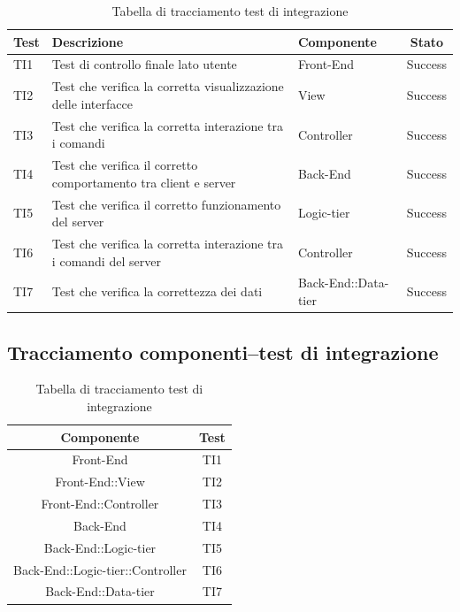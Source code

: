 \begin{center}
	\begin{table}[h]
		\begin{tabular}{|l|p{}|l|c|}
		\toprule
			\textbf{Test} & \textbf{Descrizione} & \textbf{Componente} & \textbf{Stato} \\
			\midrule
			TI1 & Test di controllo finale lato utente & Front-End & Success\\
			\midrule
			TI2 & Test che verifica la corretta visualizzazione delle interfacce & View & Success\\
			\midrule
			TI3 & Test che verifica la corretta interazione tra i comandi & Controller & Success\\
			\midrule
			TI4 & Test che verifica il corretto comportamento tra client e server & Back-End & Success\\
			\midrule
			TI5 & Test che verifica il corretto funzionamento del server & Logic-tier & Success\\
			\midrule
			TI6 & Test che verifica la corretta interazione tra i comandi del server & Controller & Success\\
			\midrule
			TI7 & Test che verifica la correttezza dei dati & Back-End::Data-tier & Success\\
		\bottomrule
		\end{tabular}
		\caption{Tabella di tracciamento test di integrazione}
	\end{table}
\end{center}
\newpage
\subsection{Tracciamento componenti–test di integrazione}
\begin{table}[h]
	\begin{center}
	\begin{tabular}{|c|c|}
	\toprule
		\textbf{Componente} & \textbf{Test}\\
	\midrule
		Front-End & TI1\\
	\midrule
		Front-End::View & TI2\\
	\midrule
		Front-End::Controller & TI3\\
	\midrule
		Back-End & TI4\\
	\midrule
		Back-End::Logic-tier & TI5\\
	\midrule
		Back-End::Logic-tier::Controller & TI6\\
	\midrule
		Back-End::Data-tier & TI7\\
	\bottomrule
	\end{tabular}
	\end{center}
	\caption{Tabella di tracciamento test di integrazione}
\end{table}


